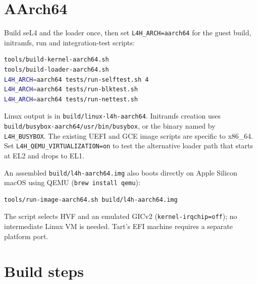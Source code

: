 \documentclass[11pt,a4paper]{report}
\newcommand{\cmd}[1]{\texttt{#1}}
\newcommand{\file}[1]{\texttt{#1}}
\begin{document}
\section{AArch64}

Build seL4 and the loader once, then set \texttt{L4H\_ARCH=aarch64}
for the guest build, initramfs, run and integration-test scripts:
\begin{lstlisting}[language=bash]
tools/build-kernel-aarch64.sh
tools/build-loader-aarch64.sh
L4H_ARCH=aarch64 tests/run-selftest.sh 4
L4H_ARCH=aarch64 tests/run-blktest.sh
L4H_ARCH=aarch64 tests/run-nettest.sh
\end{lstlisting}
Linux output is in \file{build/linux-l4h-aarch64}. Initramfs creation uses
\file{build/busybox-aarch64/usr/bin/busybox}, or the binary named by
\texttt{L4H\_BUSYBOX}. The existing UEFI and GCE image scripts are
specific to x86\_64. Set \texttt{L4H\_QEMU\_VIRTUALIZATION=on} to test
the alternative loader path that starts at EL2 and drops to EL1.

An assembled \file{build/l4h-aarch64.img} also boots directly on Apple
Silicon macOS using QEMU (\cmd{brew install qemu}):
\begin{lstlisting}[language=bash]
tools/run-image-aarch64.sh build/l4h-aarch64.img
\end{lstlisting}
The script selects HVF and an emulated GICv2
(\texttt{kernel-irqchip=off}); no intermediate Linux VM is needed.
Tart's EFI machine requires a separate platform port.


\section{Build steps}
\end{document}
